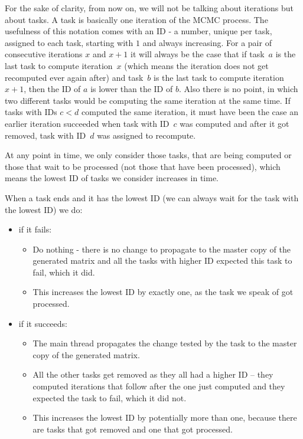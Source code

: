 For the sake of clarity, from now on, we will not be talking about iterations but about tasks. A task is basically one iteration of the MCMC process. The usefulness of this notation comes with an ID - a number, unique per task, assigned to each task, starting with $1$ and always increasing. For a pair of consecutive iterations $x$ and $x+1$ it will always be the case that if task~$a$ is the last task to compute iteration~$x$ (which means the iteration does not get recomputed ever again after) and task~$b$ is the last task to compute iteration~$x+1$, then the ID of $a$ is lower than the ID of $b$. Also there is no point, in which two different tasks would be computing the same iteration at the same time. If tasks with IDs $c<d$ computed the same iteration, it must have been the case an earlier iteration succeeded when task with ID~$c$ was computed and after it got removed, task with ID~$d$ was assigned to recompute.

At any point in time, we only consider those tasks, that are being computed or those that wait to be processed (not those that have been processed), which means the lowest ID of tasks we consider increases in time.

When a task ends and it has the lowest ID (we can always wait for the task with the lowest ID) we do:
\begin{itemize}
\item if it fails:
\begin{itemize}
\item Do nothing - there is no change to propagate to the master copy of the generated matrix and all the tasks with higher ID expected this task to fail, which it did.
\item This increases the lowest ID by exactly one, as the task we speak of got processed.
\end{itemize}
\item if it succeeds: 
\begin{itemize}
\item The main thread propagates the change tested by the task to the master copy of the generated matrix.
\item All the other tasks get removed as they all had a higher ID -- they computed iterations that follow after the one just computed and they expected the task to fail, which it did not.
\item This increases the lowest ID by potentially more than one, because there are tasks that got removed and one that got processed.
\end{itemize}
\end{itemize}

